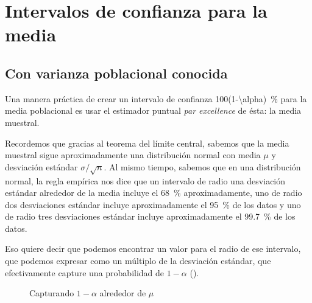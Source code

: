 \section{Intervalos de confianza para la media}

\subsection{Con varianza poblacional conocida}

Una manera práctica de crear un intervalo de confianza \qty[parse-numbers=false]{100(1-\alpha)}{\percent} para la media poblacional es usar el estimador puntual \emph{par excellence} de ésta: la media muestral.

Recordemos que gracias al teorema del límite central, sabemos que la media muestral sigue aproximadamente una distribución normal con media \(\mu\) y desviación estándar \(\sigma/\sqrt{n}\). Al mismo tiempo, sabemos que en una distribución normal, la regla empírica nos dice que un intervalo de radio una desviación estándar alrededor de la media incluye el \qty{68}{\percent} aproximadamente, uno de radio dos desviaciones estándar incluye aproximadamente el \qty{95}{\percent} de los datos y uno de radio tres desviaciones estándar incluye aproximadamente el \qty{99,7}{\percent} de los datos.

Eso quiere decir que podemos encontrar un valor para el radio de ese intervalo, que podemos expresar como un múltiplo de la desviación estándar, que efectivamente capture una probabilidad de \(1-\alpha\) ().

\begin{figure}
\caption{Capturando \(1-\alpha\) alrededor de \(\mu\)}
\end{figure}

